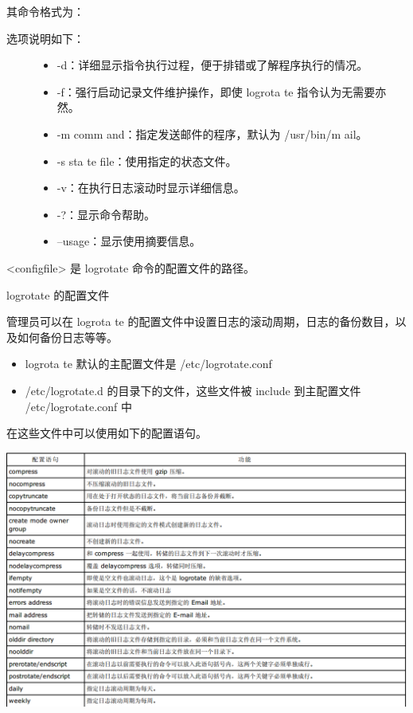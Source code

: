 \documentclass[letterpaper,10pt]{sphinxmanual}
\begin{document}
其命令格式为：
\begin{description}
\item[{选项说明如下：}] \leavevmode\begin{itemize}
\item {} 
-d：详细显示指令执行过程，便于排错或了解程序执行的情况。

\item {} 
-f：强行启动记录文件维护操作，即使 logrota te 指令认为无需要亦然。

\item {} 
-m comm and：指定发送邮件的程序，默认为 /usr/bin/m ail。

\item {} 
-s sta te file：使用指定的状态文件。

\item {} 
-v：在执行日志滚动时显示详细信息。

\item {} 
-?：显示命令帮助。

\item {} 
--usage：显示使用摘要信息。

\end{itemize}

\end{description}

\textless{}configfile\textgreater{} 是 logrotate 命令的配置文件的路径。

logrotate 的配置文件

管理员可以在 logrota te 的配置文件中设置日志的滚动周期，日志的备份数目，以及如何备份日志等等。
\begin{itemize}
\item {} 
logrota te 默认的主配置文件是 /etc/logrotate.conf

\item {} 
/etc/logrotate.d 的目录下的文件，这些文件被 include 到主配置文件 /etc/logrotate.conf 中

\end{itemize}

在这些文件中可以使用如下的配置语句。

\includegraphics{logroateconfig.png}
\end{document}
